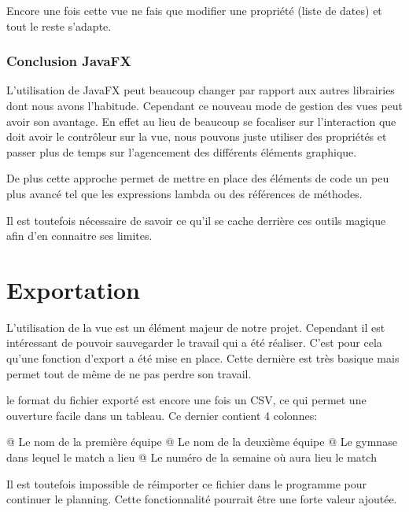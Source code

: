 \documentclass[final, noposter]{polytech/polytech}
\begin{document}
			
			Encore une fois cette vue ne fais que modifier une propriété (liste de dates) et tout le reste s'adapte.
			
		\subsubsection{Conclusion JavaFX}
			L'utilisation de JavaFX peut beaucoup changer par rapport aux autres librairies dont nous avons l'habitude.
			Cependant ce nouveau mode de gestion des vues peut avoir son avantage.
			En effet au lieu de beaucoup se focaliser sur l'interaction que doit avoir le contrôleur sur la vue, nous pouvons juste utiliser des propriétés et passer plus de temps sur l'agencement des différents éléments graphique.
			
			De plus cette approche permet de mettre en place des éléments de code un peu plus avancé tel que les expressions lambda ou des références de méthodes.
			
			Il est toutefois nécessaire de savoir ce qu'il se cache derrière ces outils magique afin d'en connaitre ses limites.
		
	\section{Exportation}
		L'utilisation de la vue est un élément majeur de notre projet.
		Cependant il est intéressant de pouvoir sauvegarder le travail qui a été réaliser.
		C'est pour cela qu'une fonction d'export a été mise en place.
		Cette dernière est très basique mais permet tout de même de ne pas perdre son travail.
		
		
		le format du fichier exporté est encore une fois un CSV, ce qui permet une ouverture facile dans un tableau.
		Ce dernier contient 4 colonnes:
		\begin{easylist}[itemize]
			@ Le nom de la première équipe
			@ Le nom de la deuxième équipe
			@ Le gymnase dans lequel le match a lieu
			@ Le numéro de la semaine où aura lieu le match
		\end{easylist}
	
		Il est toutefois impossible de réimporter ce fichier dans le programme pour continuer le planning.
		Cette fonctionnalité pourrait être une forte valeur ajoutée.
\end{document}
